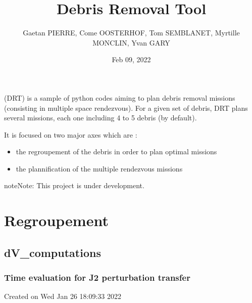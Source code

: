 \documentclass[letterpaper,10pt,english]{sphinxmanual}
\title{Debris Removal Tool}
\date{Feb 09, 2022}
\author{Gaetan PIERRE, Come OOSTERHOF, Tom SEMBLANET, Myrtille MONCLIN, Yvan GARY}
\begin{document}
\pagestyle{empty}
\sphinxmaketitle
\pagestyle{plain}
\sphinxtableofcontents
\pagestyle{normal}
\label{\detokenize{index::doc}}


 (DRT) is a sample of python codes aiming to plan debris removal missions (consisting in multiple space rendezvous). For a given set of debris, DRT plans several missions, each one including 4 to 5 debris (by default).

It is focused on two major axes which are :
\begin{itemize}
\item {} 
the regroupement of the debris in order to plan optimal missions

\item {} 
the plannification of the multiple rendezvous missions

\end{itemize}

\begin{sphinxadmonition}{note}{Note:}
This project is under development.
\end{sphinxadmonition}


\chapter{Regroupement}
\label{\detokenize{regroupement:module-regroupement}}\label{\detokenize{regroupement:regroupement}}\label{\detokenize{regroupement::doc}}

\section{dV\_computations}
\label{\detokenize{regroupement/dV_computations:dv-computations}}\label{\detokenize{regroupement/dV_computations::doc}}

\subsection{Time evaluation for J2 perturbation transfer}
\label{\detokenize{regroupement/dV_computations:time-evaluation-for-j2-perturbation-transfer}}\label{\detokenize{regroupement/dV_computations:module-regroupement.dV_computations.compute_dt_alignment}}
Created on Wed Jan 26 18:09:33 2022
\end{document}
